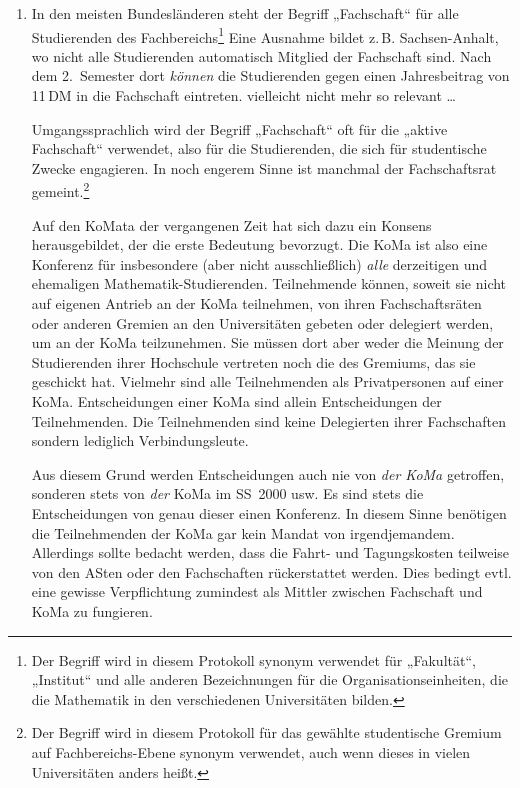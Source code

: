 \begin{enumerate}
\renewcommand\labelenumi{zu \theenumi:}
\item In den meisten Bundesländeren steht der Begriff „Fachschaft“ für alle
	Studierenden des Fachbereichs\footnote{Der Begriff wird in diesem
	Protokoll synonym verwendet für „Fakultät“, „Institut“ und alle anderen
	Bezeichnungen für die Organisationseinheiten, die die Mathematik in den
	verschiedenen Universitäten bilden.} Eine Ausnahme bildet z.\,B.
	Sachsen-Anhalt, wo nicht alle Studierenden automatisch Mitglied der
	Fachschaft sind. Nach dem 2.~Semester dort \emph{können} die
	Studierenden gegen einen Jahresbeitrag von 11\,DM in die Fachschaft
	eintreten. %
	vielleicht nicht mehr so relevant …

	Umgangssprachlich wird der Begriff „Fachschaft“ oft für die „aktive
	Fachschaft“ verwendet, also für die Studierenden, die sich für
	studentische Zwecke engagieren. In noch engerem Sinne ist manchmal der
	Fachschaftsrat gemeint.\footnote{Der Begriff wird in diesem Protokoll
	für das gewählte studentische Gremium auf Fachbereichs-Ebene synonym
	verwendet, auch wenn dieses in vielen Universitäten anders heißt.}

	Auf den KoMata der vergangenen Zeit hat sich dazu ein Konsens
	herausgebildet, der die erste Bedeutung bevorzugt. Die KoMa ist also
	eine Konferenz für insbesondere (aber nicht ausschließlich) \emph{alle}
	derzeitigen und ehemaligen Mathematik-Studierenden. Teilnehmende
	können, soweit sie nicht auf eigenen Antrieb an der KoMa teilnehmen,
	von ihren Fachschaftsräten oder anderen Gremien an den Universitäten
	gebeten oder delegiert werden, um an der KoMa teilzunehmen. Sie müssen
	dort aber weder die Meinung der Studierenden ihrer Hochschule vertreten
	noch die des Gremiums, das sie geschickt hat. Vielmehr sind alle
	Teilnehmenden als Privatpersonen auf einer KoMa. Entscheidungen einer
	KoMa sind allein Entscheidungen der Teilnehmenden. Die Teilnehmenden
	sind keine Delegierten ihrer Fachschaften sondern lediglich
	Verbindungsleute.

	Aus diesem Grund werden Entscheidungen auch nie von \emph{der KoMa}
	getroffen, sonderen stets von \emph{der} KoMa im SS~2000 usw. Es sind stets
	die Entscheidungen von genau dieser einen Konferenz. In diesem Sinne
	benötigen die Teilnehmenden der KoMa gar kein Mandat von
	irgendjemandem. Allerdings sollte bedacht werden, dass die Fahrt- und
	Tagungskosten teilweise von den ASten oder den Fachschaften
	rückerstattet werden. Dies bedingt evtl.  eine gewisse Verpflichtung
	zumindest als Mittler zwischen Fachschaft und KoMa zu fungieren.


\end{enumerate}
